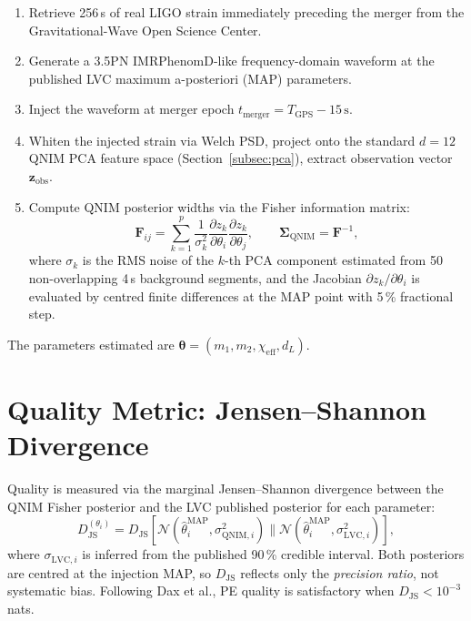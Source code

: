 \documentclass[11pt,a4paper, english]{book}
\theoremstyle{plain}
\theoremstyle{definition}
\numberwithin{equation}{chapter}
\numberwithin{figure}{chapter}
\numberwithin{table}{chapter}
\begin{document}
\begin{enumerate}
  \item Retrieve 256\,s of real LIGO strain immediately preceding the merger from the Gravitational-Wave Open Science Center.
  \item Generate a 3.5PN IMRPhenomD-like frequency-domain waveform at the published LVC maximum a-posteriori (MAP) parameters.
  \item Inject the waveform at merger epoch $t_\mathrm{merger} = T_\mathrm{GPS} - 15\,\text{s}$.
  \item Whiten the injected strain via Welch PSD, project onto the
      standard $d=12$ QNIM PCA feature space (Section~\ref{subsec:pca}),
      extract observation vector $\mathbf{z}_\mathrm{obs}$.
  \item Compute QNIM posterior widths via the Fisher information matrix:
    \begin{equation}
      \mathbf{F}_{ij} = \sum_{k=1}^{p} \frac{1}{\sigma_k^2} \frac{\partial z_k}{\partial \theta_i} \frac{\partial z_k}{\partial \theta_j}, \qquad \boldsymbol{\Sigma}_\mathrm{QNIM} = \mathbf{F}^{-1},
    \end{equation}
    where $\sigma_k$ is the RMS noise of the $k$-th PCA component estimated from 50 non-overlapping 4\,s background segments, and the Jacobian $\partial z_k/\partial \theta_i$ is evaluated by centred finite differences at the MAP point with 5\,\% fractional step.
\end{enumerate}

The parameters estimated are $\boldsymbol{\theta} = (m_1, m_2, \chi_\mathrm{eff}, d_L)$.

\section{Quality Metric: Jensen--Shannon Divergence}

Quality is measured via the marginal Jensen--Shannon divergence between the QNIM Fisher posterior and the LVC published posterior for each parameter:
\begin{equation}
  D_\mathrm{JS}^{(\theta_i)} = D_\mathrm{JS}\!\left[\mathcal{N}\!\left(\hat\theta_i^{\mathrm{MAP}}, \sigma_{\mathrm{QNIM},i}^2\right) \Big\| \mathcal{N}\!\left(\hat\theta_i^{\mathrm{MAP}}, \sigma_{\mathrm{LVC},i}^2\right)\right],
\end{equation}
where $\sigma_{\mathrm{LVC},i}$ is inferred from the published 90\,\% credible interval. Both posteriors are centred at the injection MAP, so $D_\mathrm{JS}$ reflects only the \emph{precision ratio}, not systematic bias. Following Dax et al., PE quality is satisfactory when $D_\mathrm{JS} < 10^{-3}$\,nats.
\end{document}
